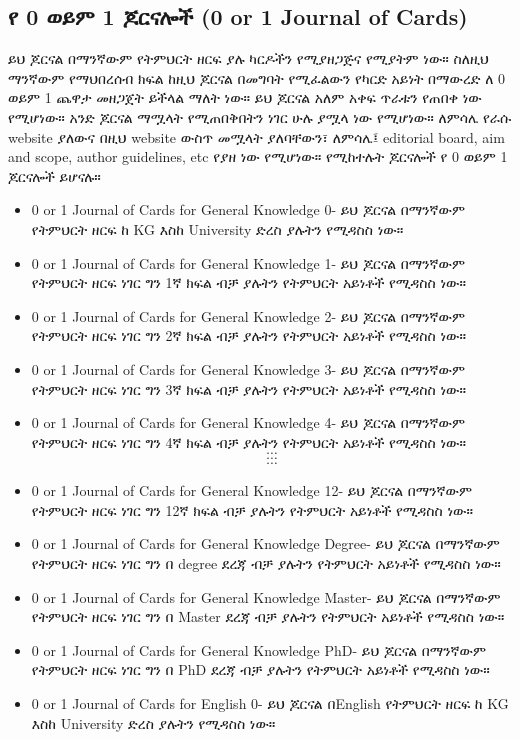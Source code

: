 \documentclass[a4paper,12pt]{article}
\newenvironment{geez}{\geezfont}{}
\begin{document}
\subsection{\begin{geez}የ 0 ወይም 1 ጆርናሎች (0 or 1 Journal of Cards)\end{geez}}
\justify
ይህ ጆርናል በማንኛውም የትምህርት ዘርፍ ያሉ ካርዶችን የሚያዘጋጅና የሚያትም ነው። ስለዚህ ማንኛውም የማህበረሰብ ክፍል ከዚህ ጆርናል በመግባት የሚፈልውን የካርድ አይነት በማውረድ ለ 0 ወይም 1 ጨዋታ መዘጋጀት ይችላል ማለት ነው። ይህ ጆርናል አለም አቀፍ ጥራቱን የጠበቀ ነው የሚሆነው። አንድ ጆርናል ማሟላት የሚጠበቅበትን ነገር ሁሉ ያሟላ ነው የሚሆነው። ለምሳሌ የራሱ website ያለውና በዚህ website ውስጥ መሟላት ያለባቸውን፣ ለምሳሌ፤ editorial board, aim and scope, author guidelines, etc የያዘ ነው የሚሆነው። የሚከተሉት ጆርናሎች የ 0 ወይም 1 ጆርናሎች ይሆናሉ።
\begin{itemize}
\item {\color{red}0 or 1 Journal of Cards for General Knowledge 0}- ይህ ጆርናል በማንኛውም የትምህርት ዘርፍ ከ KG እስከ University ድረስ ያሉትን የሚዳስስ ነው።
\item {\color{red}0 or 1 Journal of Cards for General Knowledge 1}- ይህ ጆርናል በማንኛውም የትምህርት ዘርፍ ነገር ግን 1ኛ ክፍል ብቻ ያሉትን የትምህርት አይነቶች የሚዳስስ ነው።
\item {\color{red}0 or 1 Journal of Cards for General Knowledge 2}- ይህ ጆርናል በማንኛውም የትምህርት ዘርፍ ነገር ግን 2ኛ ክፍል ብቻ ያሉትን የትምህርት አይነቶች የሚዳስስ ነው።
\item {\color{red}0 or 1 Journal of Cards for General Knowledge 3}- ይህ ጆርናል በማንኛውም የትምህርት ዘርፍ ነገር ግን 3ኛ ክፍል ብቻ ያሉትን የትምህርት አይነቶች የሚዳስስ ነው።
\item {\color{red}0 or 1 Journal of Cards for General Knowledge 4}- ይህ ጆርናል በማንኛውም የትምህርት ዘርፍ ነገር ግን 4ኛ ክፍል ብቻ ያሉትን የትምህርት አይነቶች የሚዳስስ ነው።
$$\cdots$$
$$\cdots$$
$$\cdots$$
\item {\color{red}0 or 1 Journal of Cards for General Knowledge 12}- ይህ ጆርናል በማንኛውም የትምህርት ዘርፍ ነገር ግን 12ኛ ክፍል ብቻ ያሉትን የትምህርት አይነቶች የሚዳስስ ነው።
\item {\color{red}0 or 1 Journal of Cards for General Knowledge Degree}- ይህ ጆርናል በማንኛውም የትምህርት ዘርፍ ነገር ግን በ degree ደረጃ ብቻ ያሉትን የትምህርት አይነቶች የሚዳስስ ነው።
\item {\color{red}0 or 1 Journal of Cards for General Knowledge Master}- ይህ ጆርናል በማንኛውም የትምህርት ዘርፍ ነገር ግን በ Master ደረጃ ብቻ ያሉትን የትምህርት አይነቶች የሚዳስስ ነው።
\item {\color{red}0 or 1 Journal of Cards for General Knowledge PhD}- ይህ ጆርናል በማንኛውም የትምህርት ዘርፍ ነገር ግን በ PhD ደረጃ ብቻ ያሉትን የትምህርት አይነቶች የሚዳስስ ነው።
\item {\color{red}0 or 1 Journal of Cards for English 0}- ይህ ጆርናል በEnglish የትምህርት ዘርፍ ከ KG እስከ University ድረስ ያሉትን የሚዳስስ ነው።

\end{itemize}
\end{document}
